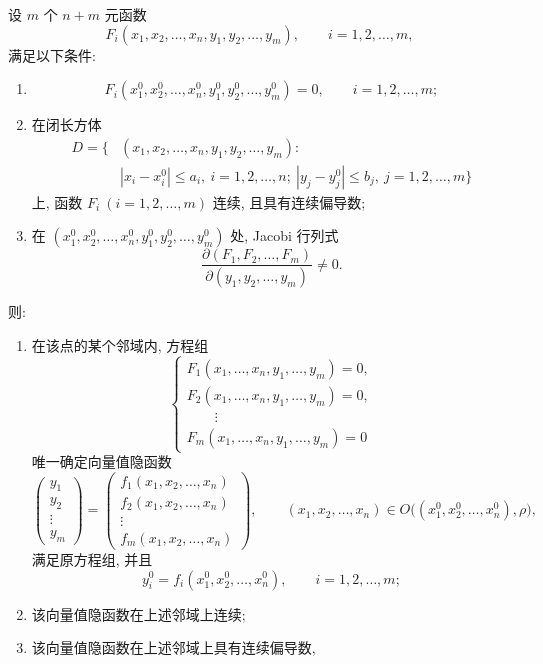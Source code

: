 \begin{theorem}[一般隐函数组存在定理]
	设 $m$ 个 $n+m$ 元函数
	\[
	F_i(x_1,x_2,\ldots,x_n,y_1,y_2,\ldots,y_m),
	\qquad i=1,2,\ldots,m,
	\]
	满足以下条件:
	\begin{enumerate}
		\item
		\[
		F_i(x_1^0,x_2^0,\ldots,x_n^0,y_1^0,y_2^0,\ldots,y_m^0)
		=0,
		\qquad i=1,2,\ldots,m;
		\]
		\item 在闭长方体
		\[
		\begin{aligned}
		D=\bigl\{&(x_1,x_2,\ldots,x_n,y_1,y_2,\ldots,y_m):\\
		&|x_i-x_i^0|\le a_i,\ i=1,2,\ldots,n;\ 
		|y_j-y_j^0|\le b_j,\ j=1,2,\ldots,m
		\bigr\}
		\end{aligned}
		\]
		上, 函数 $F_i\ (i=1,2,\ldots,m)$ 连续,
		且具有连续偏导数;
		\item 在
		$(x_1^0,x_2^0,\ldots,x_n^0,y_1^0,y_2^0,\ldots,y_m^0)$
		处, Jacobi 行列式
		\[
		\frac{\partial(F_1,F_2,\ldots,F_m)}
		{\partial(y_1,y_2,\ldots,y_m)}
		\ne0.
		\]
	\end{enumerate}
	则:
	\begin{enumerate}
		\item[(i)] 在该点的某个邻域内, 方程组
		\[
		\begin{cases}
		F_1(x_1,\ldots,x_n,y_1,\ldots,y_m)=0,\\
		F_2(x_1,\ldots,x_n,y_1,\ldots,y_m)=0,\\
		\qquad\vdots\\
		F_m(x_1,\ldots,x_n,y_1,\ldots,y_m)=0
		\end{cases}
		\]
		唯一确定向量值隐函数
		\[
		\begin{pmatrix}
		y_1\\y_2\\ \vdots\\y_m
		\end{pmatrix}
		=
		\begin{pmatrix}
		f_1(x_1,x_2,\ldots,x_n)\\
		f_2(x_1,x_2,\ldots,x_n)\\
		\vdots\\
		f_m(x_1,x_2,\ldots,x_n)
		\end{pmatrix},
		\qquad
		(x_1,x_2,\ldots,x_n)
		\in O\bigl((x_1^0,x_2^0,\ldots,x_n^0),\rho\bigr),
		\]
		满足原方程组, 并且
		\[
		y_i^0=f_i(x_1^0,x_2^0,\ldots,x_n^0),
		\qquad i=1,2,\ldots,m;
		\]
		\item[(ii)] 该向量值隐函数在上述邻域上连续;
		\item[(iii)] 该向量值隐函数在上述邻域上具有连续偏导数,
\end{enumerate}
\end{theorem}
